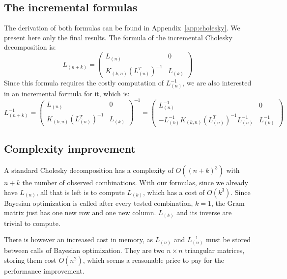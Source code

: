 \subsection{The incremental formulas}
\label{ssec:formulas}

The derivation of both formulas can be found in Appendix~\ref{app:cholesky}. We present here only the final results. The formula of the incremental Cholesky decomposition is:
\begin{equation}
  L_{(n+k)} = 
  \begin{pmatrix}
    L_{(n)} & 0 \\
    K_{(k,n)} (L_{(n)}^T)^{-1} & L_{(k)}
  \end{pmatrix}
\end{equation}
Since this formula requires the costly computation of $L_{(n)}^{-1}$, we are also interested in an incremental formula for it, which is:
\begin{equation}
  L_{(n+k)}^{-1} =
  \begin{pmatrix}
    L_{(n)} & 0 \\
    K_{(k,n)} (L_{(n)}^T)^{-1} & L_{(k)}
  \end{pmatrix}^{-1} = 
  \begin{pmatrix}
    L_{(n)}^{-1} & 0 \\
    - L_{(k)}^{-1} K_{(k,n)} (L_{(n)}^T)^{-1} L_{(n)}^{-1} & L_{(k)}^{-1}
  \end{pmatrix}
\end{equation}

\subsection{Complexity improvement}
\label{ssec:complexity}

A standard Cholesky decomposition has a complexity of $O \left( (n + k)^3 \right)$ with $n + k$ the number of observed combinations. With our formulas, since we already have $L_{(n)}$, all that is left is to compute $L_{(k)}$, which has a cost of $O \left( k^3 \right)$. Since Bayesian optimization is called after every tested combination, $k = 1$, the Gram matrix just has one new row and one new column. $L_{(k)}$ and its inverse are trivial to compute.

There is however an increased cost in memory, as $L_{(n)}$ and $L_{(n)}^{-1}$ must be stored between calls of Bayesian optimization. They are two $n \times n$ triangular matrices, storing them cost $O \left( n^2 \right)$, which seems a reasonable price to pay for the performance improvement.

